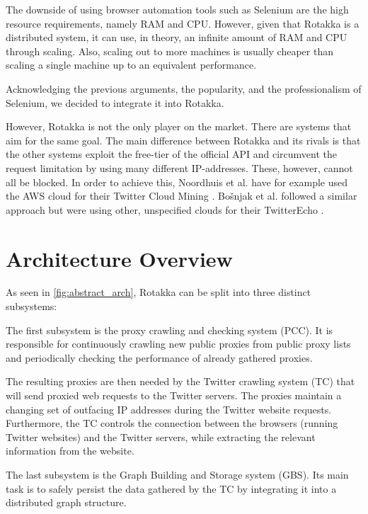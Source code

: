\documentclass{sigchi}
\begin{document}
The downside of using browser automation tools such as Selenium are the high resource requirements, namely RAM and CPU. However, given that Rotakka is a distributed system, it can use, in theory, an infinite amount of RAM and CPU through scaling. Also, scaling out to more machines is usually cheaper than scaling a single machine up to an equivalent performance.

Acknowledging the previous arguments, the popularity, and the professionalism of Selenium, we decided to integrate it into Rotakka.

However, Rotakka is not the only player on the market. There are systems that aim for the same goal. The main difference between Rotakka and its rivals is that the other systems exploit the free-tier of the official API and circumvent the request limitation by using many different IP-addresses. These, however, cannot all be blocked. In order to achieve this, Noordhuis et al. have for example used the AWS cloud for their Twitter Cloud Mining \cite{twitterCloudMining}. Bo\v{s}njak et al. followed a similar approach but were using other, unspecified clouds for their TwitterEcho \cite{twitterEcho}.


\section{Architecture Overview}

As seen in \autoref{fig:abstract_arch}, Rotakka can be split into three distinct subsystems: 

The first subsystem is the proxy crawling and checking system (PCC). It is responsible for continuously crawling new public proxies from public proxy lists and periodically checking the performance of already gathered proxies. 

The resulting proxies are then needed by the Twitter crawling system (TC) that will send proxied web requests to the Twitter servers. The proxies maintain a changing set of outfacing IP addresses during the Twitter website requests. Furthermore, the TC controls the connection between the browsers (running Twitter websites) and the Twitter servers, while extracting the relevant information from the website.

The last subsystem is the Graph Building and Storage system (GBS). Its main task is to safely persist the data gathered by the TC by integrating it into a distributed graph structure.
\end{document}
